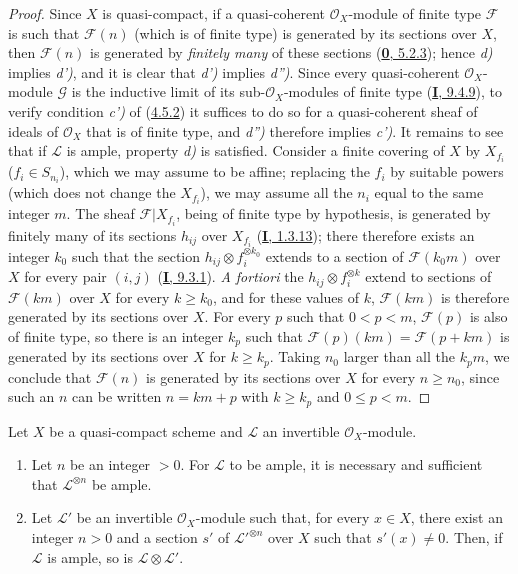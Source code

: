 \begin{proof}
Since $X$ is quasi-compact, if a quasi-coherent $\mathcal{O}_X$-module of
finite type $\mathcal{F}$ is such that $\mathcal{F}(n)$ (which is of finite type)
is generated by its sections over $X$, then $\mathcal{F}(n)$ is
generated by \emph{finitely many} of these sections
(\hyperref[0.5.2.3]{\textbf{0}, 5.2.3}); hence \emph{d)} implies \emph{d')}, and it is clear that
\emph{d')} implies \emph{d'')}. Since every quasi-coherent $\mathcal{O}_X$-module
$\mathcal{G}$ is the inductive limit of its sub-$\mathcal{O}_X$-modules of
finite type (\hyperref[I.9.4.9]{\textbf{I}, 9.4.9}), to verify condition \emph{c')}
of (\hyperref[II.4.5.2]{4.5.2}) it suffices to do so for a quasi-coherent
sheaf of ideals of $\mathcal{O}_X$ that is of finite type, and \emph{d'')}
therefore implies \emph{c')}. It remains to see that if $\mathcal{L}$ is ample, property
\emph{d)} is satisfied. Consider a finite covering of $X$ by
$X_{f_i}$ ($f_i\in S_{n_i}$), which we may assume to be affine; replacing the
$f_i$ by suitable powers (which does not change the $X_{f_i}$),
we may assume all the $n_i$ equal to the same integer $m$. The sheaf
$\mathcal{F}|X_{f_i}$, being of finite type by hypothesis, is generated by
finitely many of its sections $h_{ij}$ over $X_{f_i}$
(\hyperref[I.1.3.13]{\textbf{I}, 1.3.13}); there therefore exists an integer $k_0$ such that
the section $h_{ij}\otimes f_i^{\otimes k_0}$ extends to a section of
$\mathcal{F}(k_0m)$ over $X$ for every pair $(i,j)$
(\hyperref[I.9.3.1]{\textbf{I}, 9.3.1}). \emph{A fortiori} the
$h_{ij}\otimes f_i^{\otimes k}$ extend to sections of
$\mathcal{F}(km)$ over $X$ for every $k\geq k_0$, and for these values
of $k$, $\mathcal{F}(km)$ is therefore generated by its sections over
$X$. For every $p$ such that $0<p<m$, $\mathcal{F}(p)$ is also of finite type,
so there is an integer $k_p$ such that
$\mathcal{F}(p)(km)=\mathcal{F}(p+km)$ is generated by its sections
over $X$ for $k\geq k_p$. Taking $n_0$ larger than all the
$k_pm$, we conclude that $\mathcal{F}(n)$ is generated by its sections
over $X$ for every $n\geq n_0$, since such an $n$ can be written $n=km+p$ with
$k\geq k_p$ and $0\leq p<m$.
\end{proof}

\begin{proposition}[4.5.6]
\label{II.4.5.6}
Let $X$ be a quasi-compact scheme and $\mathcal{L}$ an invertible
$\mathcal{O}_X$-module.
\begin{enumerate}
  \item[\rm{(i)}] Let $n$ be an integer $>0$. For $\mathcal{L}$ to be
  ample, it is necessary and sufficient that $\mathcal{L}^{\otimes n}$ be ample.
  \item[\rm{(ii)}] Let $\mathcal{L}'$ be an invertible $\mathcal{O}_X$-module
  such that, for every $x\in X$, there exist an integer $n>0$
  and a section $s'$ of $\mathcal{L}'^{\otimes n}$ over $X$ such
  that $s'(x)\neq0$. Then, if $\mathcal{L}$ is ample, so is
  $\mathcal{L}\otimes\mathcal{L}'$.
\end{enumerate}
\end{proposition}

